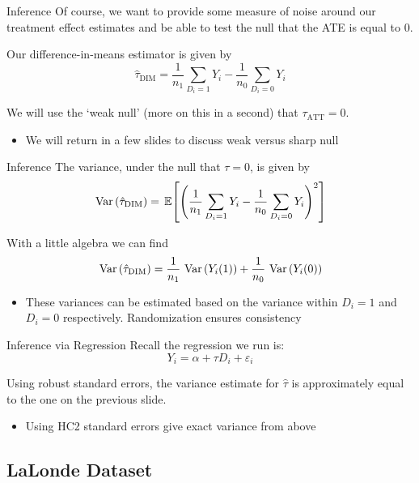 \documentclass[aspectratio=169,t,11pt,table]{beamer}
\begin{document}
\begin{frame}{Inference}
  Of course, we want to provide some measure of noise around our treatment effect estimates and be able to test the null that the ATE is equal to 0. 
  
  \bigskip
  Our difference-in-means estimator is given by
  $$
    \hat{\tau}_{\text{DIM}} = \frac{1}{n_1} \sum_{D_i = 1} Y_i - \frac{1}{n_0} \sum_{D_i = 0} Y_i
  $$

	\bigskip
  We will use the `weak null' (more on this in a second) that $\tau_{\text{ATT}} = 0$. 
	\begin{itemize}
		\item We will return in a few slides to discuss weak versus sharp null
	\end{itemize}
\end{frame}

\begin{frame}{Inference}
  The variance, under the null that $\tau = 0$, is given by
  $$
    \var{\hat{\tau}_{\text{DIM}}} = \expec{ \left( \frac{1}{n_1} \sum_{D_i = 1} Y_i - \frac{1}{n_0} \sum_{D_i = 0} Y_i \right)^2 }
  $$

  With a little algebra we can find
	\begin{align*}
		\var{\hat{\tau}_{\text{DIM}}} = \frac{1}{n_1} \var{Y_{i}(1)} + \frac{1}{n_0} \var{Y_{i}(0)}
	\end{align*}
	\begin{itemize}
		\item These variances can be estimated based on the variance within $D_i =
			1$ and $D_i = 0$ respectively. Randomization ensures consistency
	\end{itemize}
\end{frame}

\begin{frame}{Inference via Regression}
  Recall the regression we run is: 
	$$
    Y_i = \alpha + \tau D_i + \varepsilon_i
  $$

	Using robust standard errors, the variance estimate for $\hat{\tau}$ is approximately equal to the one on the previous slide. 
	\begin{itemize}
		\item Using HC2 standard errors give exact variance from above
	\end{itemize}
\end{frame}




\subsection{LaLonde Dataset}
\end{document}
